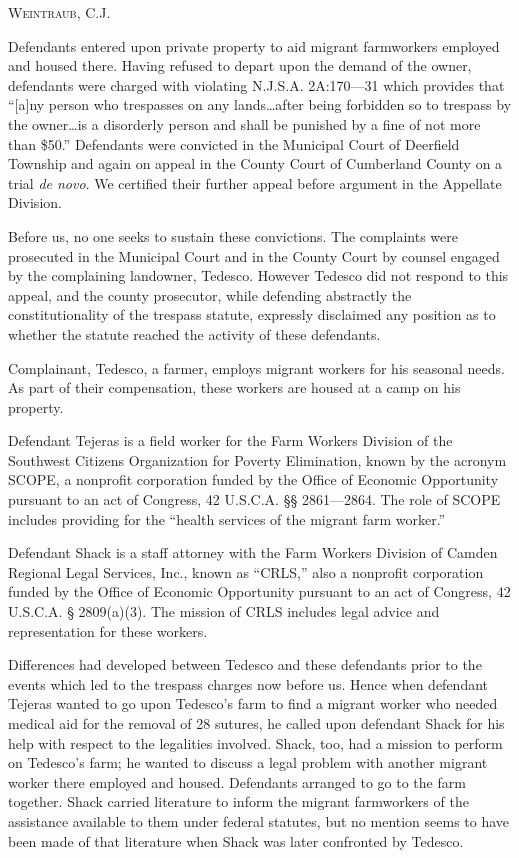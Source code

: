 
\opinion \textsc{Weintraub}, C.J.

Defendants entered upon private property to aid migrant farmworkers employed and
housed there. Having refused to depart upon the demand of the owner, defendants
were charged with violating N.J.S.A. 2A:170---31 which provides that ``[a]ny
person who trespasses on any lands\ldots after being forbidden so to trespass
by the owner\ldots is a disorderly person and shall be punished by a fine of
not more than \$50.'' Defendants were convicted in the Municipal Court of
Deerfield Township and again on appeal in the County Court of Cumberland County
on a trial \textit{de novo}. We certified their further appeal before argument
in the Appellate Division.

Before us, no one seeks to sustain these convictions. The complaints were
prosecuted in the Municipal Court and in the County Court by counsel engaged by
the complaining landowner, Tedesco. However Tedesco did not respond to this
appeal, and the county prosecutor, while defending abstractly the
constitutionality of the trespass statute, expressly disclaimed any position as
to whether the statute reached the activity of these defendants.

Complainant, Tedesco, a farmer, employs migrant workers for his seasonal needs.
As part of their compensation, these workers are housed at a camp on his
property.

Defendant Tejeras is a field worker for the Farm Workers Division of the
Southwest Citizens Organization for Poverty Elimination, known by the acronym
SCOPE, a nonprofit corporation funded by the Office of Economic Opportunity
pursuant to an act of Congress, 42 U.S.C.A. {\S}{\S} 2861---2864. The role of
SCOPE includes providing for the ``health services of the migrant farm
worker.''

Defendant Shack is a staff attorney with the Farm Workers Division of Camden
Regional Legal Services, Inc., known as ``CRLS,'' also a nonprofit corporation
funded by the Office of Economic Opportunity pursuant to an act of Congress, 42
U.S.C.A. {\S} 2809(a)(3). The mission of CRLS includes legal advice and
representation for these workers.

Differences had developed between Tedesco and these defendants prior to the
events which led to the trespass charges now before us. Hence when defendant
Tejeras wanted to go upon Tedesco's farm to find a migrant worker who needed
medical aid for the removal of 28 sutures, he called upon defendant Shack for
his help with respect to the legalities involved. Shack, too, had a mission to
perform on Tedesco's farm; he wanted to discuss a legal problem with another
migrant worker there employed and housed. Defendants arranged to go to the farm
together. Shack carried literature to inform the migrant farmworkers of the
assistance available to them under federal statutes, but no mention seems to
have been made of that literature when Shack was later confronted by Tedesco.

